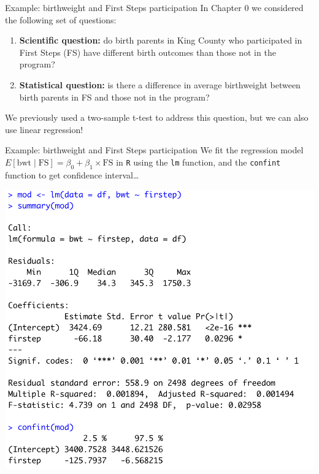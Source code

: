 \documentclass[10pt,t]{beamer}
\begin{document}
\begin{frame}{Example: birthweight and First Steps participation}
In Chapter 0 we considered the following set of questions:

\vspace{0.3cm}

\begin{enumerate}
	\item \textbf{Scientific question:} do birth parents in King County who participated in First Steps (FS) have different birth outcomes than those not in the program?
	\item \textbf{Statistical question:} is there a difference in average birthweight between birth parents in FS and those not in the program?
\end{enumerate}

\vspace{0.3cm} We previously used a two-sample t-test to address this question, but we can also use linear regression!

\end{frame}

\begin{frame}{Example: birthweight and First Steps participation}
We fit the regression model $E[\text{bwt} \mid \text{FS}] = \beta_0 + \beta_1 \times \text{FS}$ in \texttt{R} using the \texttt{lm} function, and the \texttt{confint} function to get confidence interval\dots

\vspace{0.2cm}

\centering \includegraphics[scale=0.35]{figures/lm_bwt_fs.png}
\end{frame}
\end{document}
